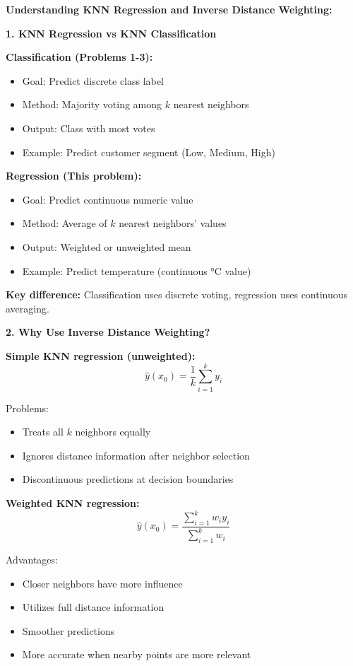 \documentclass[12pt]{article}
\begin{document}
\begin{explanation}
\textbf{Understanding KNN Regression and Inverse Distance Weighting:}

\textbf{1. KNN Regression vs KNN Classification}

\textbf{Classification (Problems 1-3):}
\begin{itemize}
    \item Goal: Predict discrete class label
    \item Method: Majority voting among \(k\) nearest neighbors
    \item Output: Class with most votes
    \item Example: Predict customer segment (Low, Medium, High)
\end{itemize}

\textbf{Regression (This problem):}
\begin{itemize}
    \item Goal: Predict continuous numeric value
    \item Method: Average of \(k\) nearest neighbors' values
    \item Output: Weighted or unweighted mean
    \item Example: Predict temperature (continuous °C value)
\end{itemize}

\textbf{Key difference:} Classification uses discrete voting, regression uses continuous averaging.

\textbf{2. Why Use Inverse Distance Weighting?}

\textbf{Simple KNN regression (unweighted):}
\[
\hat{y}(x_0) = \frac{1}{k} \sum_{i=1}^k y_i
\]

Problems:
\begin{itemize}
    \item Treats all \(k\) neighbors equally
    \item Ignores distance information after neighbor selection
    \item Discontinuous predictions at decision boundaries
\end{itemize}

\textbf{Weighted KNN regression:}
\[
\hat{y}(x_0) = \frac{\sum_{i=1}^k w_i y_i}{\sum_{i=1}^k w_i}
\]

Advantages:
\begin{itemize}
    \item Closer neighbors have more influence
    \item Utilizes full distance information
    \item Smoother predictions
    \item More accurate when nearby points are more relevant
\end{itemize}


\end{explanation}
\end{document}
